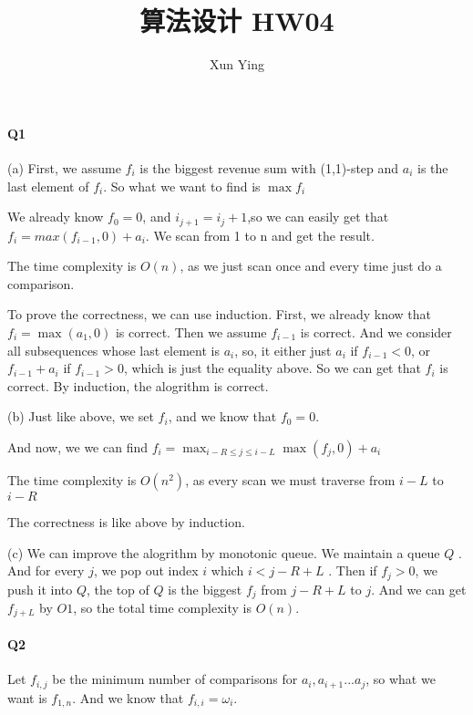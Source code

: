 \documentclass[UTF8]{ctexart}
\renewcommand{\(}{\left(}
\renewcommand{\)}{\right)}
\begin{document}
\title{算法设计 HW04}  
\author{Xun Ying}
\maketitle

\paragraph{Q1} 

(a) First, we assume $f_{i}$ is the biggest revenue sum with (1,1)-step and $a_{i}$ is the last
element of $f_{i}$. So what we want to find is $\max{f_{i}}$

We already know $f_{0} = 0$, and $i_{j+1} = i_{j} + 1$,so we can easily get that 
$f_{i} = max(f_{i-1},0) + a_{i}$. We scan from 1 to n and get the result.

The time complexity is $O(n)$, as we just scan once and every time just do a comparison.

To prove the correctness, we can use induction. First, we already know that $f_{i} = \max(a_{1}, 0)$ is correct. 
Then we assume $f_{i-1}$ is correct. And we consider all subsequences whose last element is $a_{i}$,
so, it either just $a_{i}$ if $f_{i-1} < 0$, or $f_{i-1} + a_{i}$ if $f_{i-1} > 0$, which 
is just the equality above. So we can get that $f_{i}$ is correct.
By induction, the alogrithm is correct.

(b) Just like above, we set $f_{i}$, and we know that $f_{0} = 0$.

And now, we we can find $f_{i} = \max_{i-R \leq j \leq i-L}{\max(f_{j},0) + a_i}$ 

The time complexity is $O(n^{2})$, as every scan we must traverse from $i-L$ to $i-R$

The correctness is like above by induction. 

(c) We can improve the alogrithm by monotonic queue. We maintain a queue $Q$ . 
And for every $j$, we pop out index $i$ which $i < j - R + L$ .
Then if $f_{j} > 0$, we push it into $Q$, the top of $Q$ is the biggest $f_{j}$ from $j-R+L$ to $j$.
And we can get $f_{j+L}$ by $O{1}$, so the total time complexity is $O(n)$.

\paragraph{Q2} 
Let $f_{i,j}$ be the minimum number of comparisons for $a_{i}, a_{i+1} ... a_{j}$, so what we want
is $f_{1,n}$. And we know that $f_{i,i} = \omega _{i}$.
\end{document}
